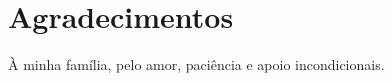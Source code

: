 \documentclass[11pt,twoside,a4paper]{book}
\begin{document}
%
%
%
%
%
%
%
%
%
%    
%      



\chapter*{Agradecimentos}
À minha família, pelo amor, paciência e apoio incondicionais.
\end{document}

